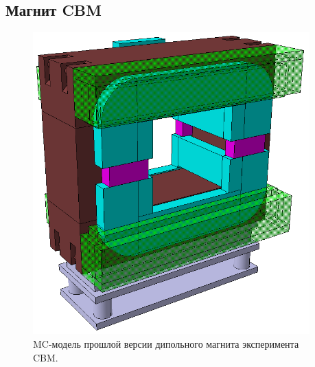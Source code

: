 
\subsection{Магнит CBM}\label{sec:secCbmMagnet}


\begin{figure}[H]
\begin{minipage}[b]{0.495\textwidth}
\includegraphics[width=0.95\textwidth]{pictures/Old_magnet_2.png}
\caption{MC-модель прошлой версии дипольного магнита эксперимента CBM.}
\label{fig:OldCbmMagnet1}
\end{minipage}
\hspace{0.01\textwidth}
\begin{minipage}[b]{0.495\textwidth}

\end{minipage}
\end{figure}
